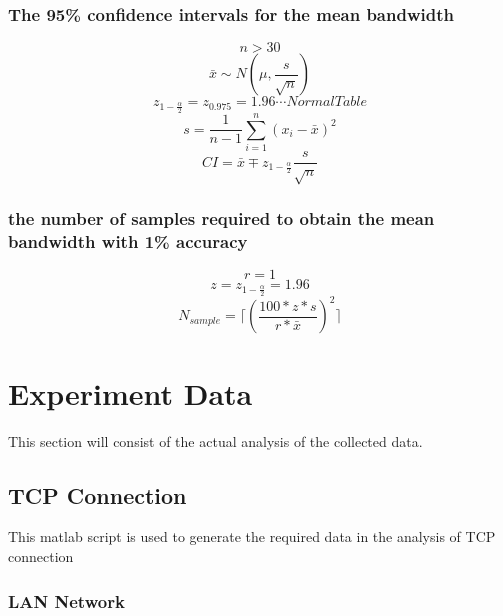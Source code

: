 \documentclass[aps,letterpaper,10pt]{revtex4}
\begin{document}
        \subsubsection{The 95\% confidence intervals for the mean bandwidth}
            \[
            n > 30
            \]
            \[
            \bar{x} \sim N(\mu , \frac{s}{\sqrt{n}})
            \]
            \[
            z_{1-\frac{\alpha}{2}} = z_{0.975} = 1.96 \cdots Normal Table
            \]
            \[
            s = \frac{1}{n-1}\sum_{i=1}^n{(x_{i} - \bar{x})^2}
            \]
            \[
            CI = \bar{x} \mp z_{1-\frac{\alpha}{2}}\frac{s}{\sqrt{n}}
            \]
        \subsubsection{the number of samples required to obtain the mean bandwidth with 1\% accuracy}
            \[
            r = 1
            \]
            \[
            z = z_{1-\frac{\alpha}{2}} = 1.96
            \]
            \[
            N_{sample} = \lceil (\frac{100*z*s}{r*\bar{x}})^2 \rceil
            \]
           

\newpage
\section{Experiment Data}
This section will consist of the actual analysis of the collected data.  \vspace{5mm}
    \subsection{TCP Connection}
    This matlab script is used to generate the required data in the analysis of TCP connection    
    	
    	\vspace{3mm}
        \newpage
        \subsubsection{LAN Network}
\end{document}
